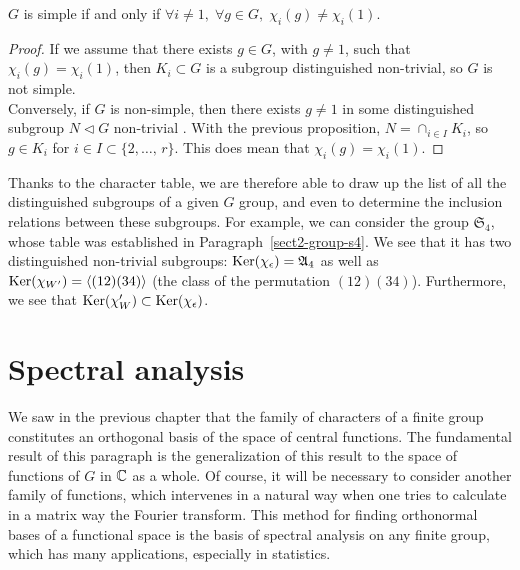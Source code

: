  
\begin{cor}
 $ G $ is simple if and only if $ \forall i \neq 1, \; \forall g \in G, \; \chi_i (g) \neq \chi_i (1) $.
\end{cor}
\begin{proof}
If we assume that there exists $ g \in G $, with $ g \neq 1 $, such that $ \chi_i (g) = \chi_i (1) $, then $ K_i \subset G $ is a subgroup distinguished non-trivial, so $ G $ is not simple. \\Conversely, if $ G $ is non-simple, then there exists $ g \neq 1 $ in some distinguished subgroup $ N \lhd G $ non-trivial . With the previous proposition, $ N = \cap_{i \in I}{K_i} $, so $ g \in K_i $ for $ i \in I \subset \{2, \ldots, \, r\} $. This does mean that $ \chi_i (g) = \chi_i (1) $.
\end{proof}
Thanks to the character table, we are therefore able to draw up the list of all the distinguished subgroups of a given $ G $ group, and even to determine the inclusion relations between these subgroups. For example, we can consider the group $ \mathfrak{S}_4 $, whose table was established in Paragraph~\ref{sect2-group-s4}. We see that it has two distinguished non-trivial subgroups: $ \operatorname{Ker} (\chi_{\epsilon}) = \mathfrak{A}_4 $ as well as $ \operatorname{Ker} (\chi_{W'}) = \langle ( 12) (34) \rangle $ (the class of the permutation $ (12) (34) $). Furthermore, we see that $ \operatorname{Ker} (\chi_W') \subset \operatorname{Ker} (\chi_\epsilon) $.
\section{Spectral analysis}
 
We saw in the previous chapter that the family of characters of a finite group constitutes an orthogonal basis of the space of central functions. The fundamental result of this paragraph is the generalization of this result to the space of functions of $ G $ in $ \mathbb{C} $ as a whole. Of course, it will be necessary to consider another family of functions, which intervenes in a natural way when one tries to calculate in a matrix way the Fourier transform. This method for finding orthonormal bases of a functional space is the basis of spectral analysis on any finite group, which has many applications, especially in statistics.
